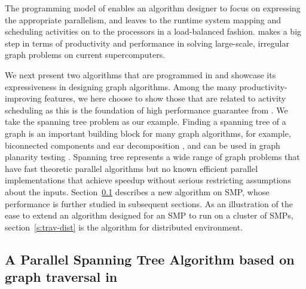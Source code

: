 The programming model of \Xten{} enables an algorithm designer to focus on expressing the appropriate parallelism, and leaves to the runtime system mapping and scheduling activities on to the processors in a load-balanced fashion. \Xten{} makes a big step in terms of productivity and performance in solving large-scale, irregular graph problems on current supercomputers.


 We next present two algorithms that are programmed in \Xten{} and showcase its expressiveness in designing graph algorithms. Among the many productivity-improving features, we here choose to show those that are related to activity scheduling as this is the foundation of high performance guarantee from \Xten{}. 
We take the spanning tree problem as our example. Finding a spanning tree of a graph is an important building
block for many graph algorithms, for example, biconnected components
and ear decomposition \cite{MR86}, and can be used in graph planarity testing \cite{KR88}.
Spanning tree represents a wide range of graph problems that have fast
theoretic parallel algorithms but no known efficient
parallel implementations that achieve speedup without serious restricting assumptions about the inputs. 
Section~\ref{s:trav} describes a new algorithm on SMP, whose performance is further studied in subsequent sections.
As an illustration of the ease to extend an algorithm designed for an SMP to run on a cluster of SMPs, section~\ref{s:trav-dist} is the algorithm
for distributed environment. 

 

\subsection{A Parallel Spanning Tree Algorithm based on graph traversal in \Xten{}}
\label{s:trav}

